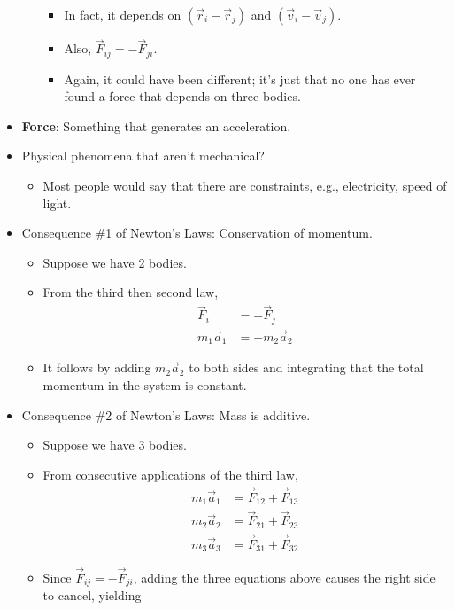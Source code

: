 \documentclass[../notes.tex]{subfiles}
\begin{document}
\begin{itemize}
\begin{itemize}
\begin{itemize}
            \item In fact, it depends on $(\vec{r}_i-\vec{r}_j)$ and $(\vec{v}_i-\vec{v}_j)$.
            \item Also, $\vec{F}_{ij}=-\vec{F}_{ji}$.
            \item Again, it could have been different; it's just that no one has ever found a force that depends on three bodies.
        \end{itemize}
    \end{itemize}
    \item \textbf{Force}: Something that generates an acceleration.
    \item Physical phenomena that aren't mechanical?
    \begin{itemize}
        \item Most people would say that there are constraints, e.g., electricity, speed of light.
    \end{itemize}
    \item Consequence \#1 of Newton's Laws: Conservation of momentum.
    \begin{itemize}
        \item Suppose we have 2 bodies.
        \item From the third then second law,
        \begin{align*}
            \vec{F}_i &= -\vec{F}_j\\
            m_1\vec{a}_1 &= -m_2\vec{a}_2
        \end{align*}
        \item It follows by adding $m_2\vec{a}_2$ to both sides and integrating that the total momentum in the system is constant.
    \end{itemize}
    \item Consequence \#2 of Newton's Laws: Mass is additive.
    \begin{itemize}
        \item Suppose we have 3 bodies.
        \item From consecutive applications of the third law,
        \begin{align*}
            m_1\vec{a}_1 &= \vec{F}_{12}+\vec{F}_{13}\\
            m_2\vec{a}_2 &= \vec{F}_{21}+\vec{F}_{23}\\
            m_3\vec{a}_3 &= \vec{F}_{31}+\vec{F}_{32}
        \end{align*}
        \item Since $\vec{F}_{ij}=-\vec{F}_{ji}$, adding the three equations above causes the right side to cancel, yielding

\end{itemize}
\end{itemize}
\end{document}
